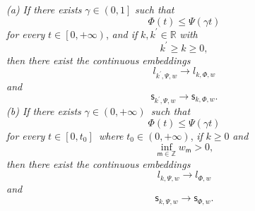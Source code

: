 \documentclass{article}
\begin{document}
\textit{(a) If there exists }$\gamma \in \left( 0,1\right] $ \textit{such
that}%
\begin{equation}
\Phi (t)\leq \Psi (\gamma t)  \label{growthestimate}
\end{equation}%
\textit{for every }$t\in \left[ 0,+\infty \right) $, \textit{and if }$%
k,k^{\prime }\in \mathbb{R}$ \textit{with} 
\begin{equation}
k^{\prime }\geq k\geq 0,  \label{inequality7}
\end{equation}%
\textit{then there exist the continuous embeddings}%
\begin{equation}
l_{k^{\prime },\Psi ,w}\rightarrow l_{k,\Phi ,w}  \label{embedding1}
\end{equation}%
\textit{and}%
\begin{equation}
\mathsf{s}_{k^{\prime },\Psi ,w}\rightarrow \mathsf{s}_{k,\Phi ,w}.
\label{embedding2}
\end{equation}%
\textit{(b) If there exists }$\gamma \in (0,+\infty )$\textit{\ such that}%
\begin{equation}
\Phi (t)\leq \Psi (\gamma t)  \label{inequality8}
\end{equation}%
\textit{for every }$t\in \left[ 0,t_{0}\right] $\textit{\ where} $t_{0}\in
\left( 0,+\infty \right) $, \textit{if }$k\geq 0$ \textit{and} 
\begin{equation}
\inf_{\mathsf{m}\in \mathbb{Z}}w_{\mathsf{m}}>0,  \label{infimumbis}
\end{equation}%
\textit{then there exist the continuous embeddings}%
\begin{equation}
l_{k,\Psi ,w}\rightarrow l_{\Phi ,w}  \label{embedding3}
\end{equation}%
\textit{and}%
\begin{equation}
\mathsf{s}_{k,\Psi ,w}\rightarrow \mathsf{s}_{\Phi ,w}.  \label{embedding4}
\end{equation}

\bigskip
\end{document}
